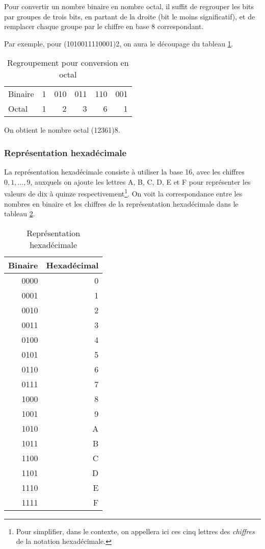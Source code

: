 \documentclass[11pt]{article}
\begin{document}
Pour convertir un nombre binaire en nombre octal, il suffit de
regrouper les bits par groupes de trois bits, en partant de la droite
(bit le moins significatif), et de remplacer chaque groupe par le
chiffre en base 8 correspondant.

Par exemple, pour (1010011110001)2, on aura le découpage du tableau
\ref{tab:org1bfb06d}.

\begin{table}[htbp]
\caption{\label{tab:org1bfb06d}Regroupement pour conversion en octal}
\centering
\begin{tabular}{lrrrrr}
 &  &  &  &  & \\[0pt]
\hline
Binaire & 1 & 010 & 011 & 110 & 001\\[0pt]
Octal & 1 & 2 & 3 & 6 & 1\\[0pt]
\end{tabular}
\end{table}

On obtient le nombre octal (12361)8.

\subsubsection{Représentation hexadécimale}
\label{sec:org6ac32d6}

La représentation hexadécimale consiste à utiliser la base 16, avec
les chiffres \(0, 1, \ldots, 9\), auxquels on ajoute les lettres A, B,
C, D, E et F pour représenter les valeurs de dix à quinze
respectivement\footnote{Pour simplifier, dans le contexte, on appellera ici ces cinq
lettres des \emph{chiffres} de la notation hexadécimale.}. On voit la correspondance entre les nombres en binaire et les chiffres de la représentation hexadécimale dans le tableau \ref{tab:orga4ef4d6}.

\begin{table}[htbp]
\caption{\label{tab:orga4ef4d6}Représentation hexadécimale}
\centering
\begin{tabular}{rr}
Binaire & Hexadécimal\\[0pt]
\hline
0000 & 0\\[0pt]
0001 & 1\\[0pt]
0010 & 2\\[0pt]
0011 & 3\\[0pt]
0100 & 4\\[0pt]
0101 & 5\\[0pt]
0110 & 6\\[0pt]
0111 & 7\\[0pt]
1000 & 8\\[0pt]
1001 & 9\\[0pt]
1010 & A\\[0pt]
1011 & B\\[0pt]
1100 & C\\[0pt]
1101 & D\\[0pt]
1110 & E\\[0pt]
1111 & F\\[0pt]
\end{tabular}
\end{table}
\end{document}
